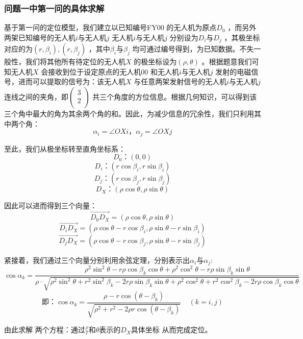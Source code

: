 \documentclass[withoutpreface,bwprint]{cumcmthesis} %
\begin{document}
		\subsubsection{问题一中第一问的具体求解}
		\par 基于第一问的定位模型，我们建立以已知编号FY$ 00 $ 的无人机为原点$ D_0 $ ，而另外两架已知编号的$ \text{无人机}i\text{与无人机}j $ $ \text{无人机}i\text{与无人机}j $ 分别设为$ D_i\text{与}D_j $ ，其极坐标对应的为$ \left( r,\beta _i \right) ,\left( r,\beta _j \right)  $ ，其中$ \beta _i\text{与}\beta _j $ 均可通过编号得到，为已知数据。不失一般性，我们将其他所有待定位的无人机$ X $ 的极坐标设为$ \left( \rho ,\theta \right)  $ 。根据题意我们可知无人机$ X $ 会接收到位于设定原点的无人机$ 00 $ 和$ \text{无人机}i\text{与无人机}j $ 发射的电磁信号，进而可以提取的信号为：该无人机$ X $ 与任意两架发射信号的$ \text{无人机}i\text{与无人机}j $ 连线之间的夹角，即$ \left( \begin{array}{c} 	3\\ 	2\\ \end{array} \right)  $ 共三个角度的方位信息。根据几何知识，可以得到该三个角中最大的角为其余两个角的和。因此，为减少信息的冗余性，我们只利用其中两个角：$$ \alpha _i=\angle OXi\text{，}\alpha _j=\angle OXj $$ 
		\par 至此，我们从极坐标转至直角坐标系： 
		$$ D_0\text{：}\left( 0,0 \right)  $$ $$ D_i\text{：}\left( r\cos \beta _i,r\sin \beta _i \right)  $$ $$ D_j\text{：}\left( r\cos \beta _j,r\sin \beta _j \right)  $$ $$ D_X\text{：}\left( \rho \cos \theta ,\rho \sin \theta \right)  $$ 
		\par 因此可以进而得到三个向量：
		$$ \overrightarrow{D_0D_X}=\left( \rho \cos \theta ,\rho \sin \theta \right)  $$ $$ \overrightarrow{D_iD_X}=\left( \rho \cos \theta -r\cos \beta _i,\rho \sin \theta -r\sin \beta _i \right)  $$ $$ \overrightarrow{D_jD_X}=\left( \rho \cos \theta -r\cos \beta _j,\rho \sin \theta -r\sin \beta _j \right)  $$ 	
		\par 紧接着，我们通过三个向量分别利用余弦定理，分别表示出$ \alpha _i\text{与}\alpha _j $: 
		$$ \cos \alpha _k=\frac{\rho ^2\sin ^2\theta -r\rho \cos \beta _k\cos \theta +\rho ^2\cos ^2\theta -r\rho \sin \beta _k\sin \theta}{\rho ·\sqrt{\rho ^2\sin ^2\theta +r^2\sin ^2\beta _k-2r\rho \sin \beta _k\sin \theta +\rho ^2\cos ^2\theta +r^2\cos ^2\beta _k-2r\rho \cos \beta _k\cos \theta}} $$ $$ \text{即：}\cos \alpha _k=\frac{\rho -r\cos \left( \theta -\beta _k \right)}{\sqrt{\rho ^2+r^2-2\rho r\cos \left( \theta -\beta _k \right)}}\ \ \ \ \ \left( k=i,j \right)  $$ 
		\par 由此求解 两个方程：$ \text{通过}\frac{\rho}{r}\text{和}\theta \text{表示的}D_X\text{具体坐标} $ 从而完成定位。
			
\end{document}
